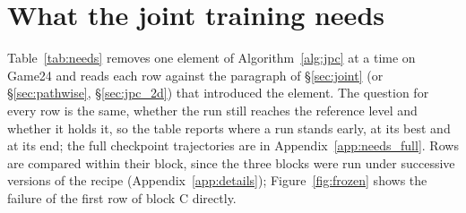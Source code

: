 \section{What the joint training needs}
\label{sec:ablations}
Table~\ref{tab:needs} removes one element of Algorithm~\ref{alg:jpc} at a time on Game24 and reads each row against the paragraph of \S\ref{sec:joint} (or \S\ref{sec:pathwise}, \S\ref{sec:jpc_2d}) that introduced the element. The question for every row is the same, whether the run still reaches the reference level and whether it holds it, so the table reports where a run stands early, at its best and at its end; the full checkpoint trajectories are in Appendix~\ref{app:needs_full}. Rows are compared within their block, since the three blocks were run under successive versions of the recipe (Appendix~\ref{app:details}); Figure~\ref{fig:frozen} shows the failure of the first row of block C directly.

